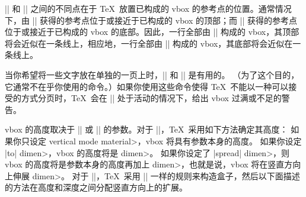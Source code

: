 |\vtop| 和 |\vbox| 之间的不同点在于 \TeX\ 放置已构成的 vbox 的参考点的位置。通常情况下，由 |\vtop| 获得的参考点位于或接近于已构成的 vbox 的顶部；而 |\vbox| 获得的参考点位于或接近于已构成的 vbox 的底部。因此，一行全部由 |\vtop| 构成的 vbox，其顶部将会近似在一条线上，相应地，一行全部由 |\vbox| 构成的 vbox，其底部将会近似在一条线上。

当你希望将一些文字放在单独的一页上时，|\vtop| 和 |\vbox| 是有用的。
（为了这个目的，它通常不在乎你使用的命令。）如果你使用这些命令使得 \TeX\ 不能以一种可以接受的方式分页时，\TeX\ 会在 |\output| 处于活动的情况下，给出 vbox 过满或不足的警告。

vbox 的高度取决于 |\vtop| 或 |\vbox| 的参数。对于 |\vbox|，\TeX\ 采用如下方法确定其高度：
\ulist\compact
\li 如果你只设定 \<vertical mode material>，vbox 将具有参数本身的高度。
\li 如果你设定 |to| \<dimen>，vbox 的高度将是 \<dimen>。
\li 如果你设定了 |spread| \<dimen>，则 vbox 的高度将是参数本身的高度再加上 \<dimen>，也就是说，vbox 将在竖直方向上伸展 \<dimen>。
\endulist
\noindent
对于 |\vtop|，\TeX\ 采用 |\vbox| 一样的规则来构造盒子，然后以下面描述的方法在高度和深度之间分配竖直方向上的扩展。

